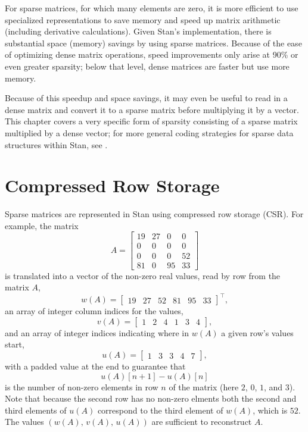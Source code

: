 \noindent
For sparse matrices, for which many elements are zero, it is more
efficient to use specialized representations to save memory and speed
up matrix arithmetic (including derivative calculations).  Given
Stan's implementation, there is substantial space (memory) savings by
using sparse matrices.  Because of the ease of optimizing dense matrix
operations, speed improvements only arise at 90\% or even greater
sparsity; below that level, dense matrices are faster but use more memory.  

Because of this speedup and space savings, it may even be useful to
read in a dense matrix and convert it to a sparse matrix before
multiplying it by a vector.  This chapter covers a very specific form
of sparsity consisting of a sparse matrix multiplied by a dense
vector; for more general coding strategies for sparse data structures
within Stan, see .

\section{Compressed Row Storage}\label{CSR.section}

Sparse matrices are represented in Stan using compressed row storage
(CSR).  For example, the matrix
\[
A = 
\begin{bmatrix}
19 & 27 & 0 & 0 
\\ 
0 & 0 & 0 & 0 
\\
0 & 0 & 0 & 52
\\
81 & 0 & 95 & 33
\end{bmatrix}
\]
is translated into a vector of the non-zero real values, read by row
from the matrix $A$,
\[
w(A) =
\begin{bmatrix}
19 & 27 & 52 & 81 & 95 & 33
\end{bmatrix}^{\top} \! \! \! ,
\]
an array of integer column indices for the values,
\[
v(A) = 
\begin{bmatrix}
1 & 2 & 4 & 1 & 3 & 4
\end{bmatrix} \! ,
\]
and an array of integer indices indicating where in $w(A)$ a given row's
values start,
\[
u(A) = 
\begin{bmatrix}
1 & 3 & 3 & 4 & 7
\end{bmatrix} \! ,
\]
with a padded value at the end to guarantee that 
\[
u(A)[n+1] - u(A)[n]
\]
is the number of non-zero elements in row $n$ of the matrix (here $2$, $0$,
$1$, and $3$). Note that because the second row has no non-zero elments both
the second and third elements of $u(A)$ correspond to the third element of
$w(A)$, which is $52$. The values $(w(A), \, v(A), \, u(A))$ are sufficient 
to reconstruct $A$.

